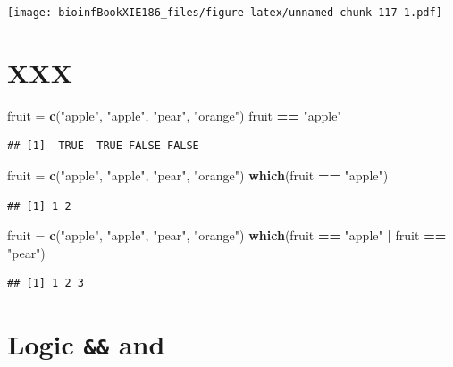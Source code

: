\documentclass[]{book}
\makeatletter
\newenvironment{Shaded}{\begin{snugshade}}{\end{snugshade}}
\newcommand{\KeywordTok}[1]{\textcolor[rgb]{0.13,0.29,0.53}{\textbf{#1}}}
\newcommand{\NormalTok}[1]{#1}
\newcommand{\OperatorTok}[1]{\textcolor[rgb]{0.81,0.36,0.00}{\textbf{#1}}}
\newcommand{\StringTok}[1]{\textcolor[rgb]{0.31,0.60,0.02}{#1}}
\newenvironment{kframe}{%
\medskip{}
\setlength{\fboxsep}{.8em}
 \def\at@end@of@kframe{}%
 \ifinner\ifhmode%
  \def\at@end@of@kframe{\end{minipage}}%
  \begin{minipage}{\columnwidth}%
 \fi\fi%
 \def\FrameCommand##1{\hskip\@totalleftmargin \hskip-\fboxsep
 \colorbox{shadecolor}{##1}\hskip-\fboxsep
     \hskip-\linewidth \hskip-\@totalleftmargin \hskip\columnwidth}%
 \MakeFramed {\advance\hsize-\width
   \@totalleftmargin\z@ \linewidth\hsize
   \@setminipage}}%
 {\par\unskip\endMakeFramed%
 \at@end@of@kframe}
\renewenvironment{Shaded}{\begin{kframe}}{\end{kframe}}
\makeatother
\begin{document}
\texttt{[image: bioinfBookXIE186\_files/figure-latex/unnamed-chunk-117-1.pdf]}

\hypertarget{xxx}{%
\section{XXX}\label{xxx}}

\begin{Shaded}
\begin{Highlighting}[]
\NormalTok{fruit =}\StringTok{ }\KeywordTok{c}\NormalTok{(}\StringTok{"apple"}\NormalTok{, }\StringTok{"apple"}\NormalTok{, }\StringTok{"pear"}\NormalTok{, }\StringTok{"orange"}\NormalTok{)}
\NormalTok{fruit }\OperatorTok{==}\StringTok{ "apple"} 
\end{Highlighting}
\end{Shaded}

\begin{verbatim}
## [1]  TRUE  TRUE FALSE FALSE
\end{verbatim}

\begin{Shaded}
\begin{Highlighting}[]
\NormalTok{fruit =}\StringTok{ }\KeywordTok{c}\NormalTok{(}\StringTok{"apple"}\NormalTok{, }\StringTok{"apple"}\NormalTok{, }\StringTok{"pear"}\NormalTok{, }\StringTok{"orange"}\NormalTok{)}
\KeywordTok{which}\NormalTok{(fruit }\OperatorTok{==}\StringTok{ "apple"}\NormalTok{)}
\end{Highlighting}
\end{Shaded}

\begin{verbatim}
## [1] 1 2
\end{verbatim}

\begin{Shaded}
\begin{Highlighting}[]
\NormalTok{fruit =}\StringTok{ }\KeywordTok{c}\NormalTok{(}\StringTok{"apple"}\NormalTok{, }\StringTok{"apple"}\NormalTok{, }\StringTok{"pear"}\NormalTok{, }\StringTok{"orange"}\NormalTok{)}
\KeywordTok{which}\NormalTok{(fruit }\OperatorTok{==}\StringTok{ "apple"} \OperatorTok{|}\StringTok{ }\NormalTok{fruit }\OperatorTok{==}\StringTok{ "pear"}\NormalTok{)}
\end{Highlighting}
\end{Shaded}

\begin{verbatim}
## [1] 1 2 3
\end{verbatim}

\hypertarget{logic-and}{%
\section{\texorpdfstring{Logic \texttt{\&\&} and \texttt{\textbar{}}}{Logic \&\& and \textbar{}}}\label{logic-and}}
\end{document}
